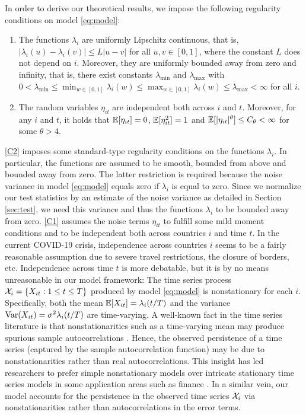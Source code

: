 \documentclass[a4paper,12pt]{article}
\numberwithin{equation}{section}
\begin{document}
In order to derive our theoretical results, we impose the following regularity conditions on model \eqref{eq:model}:
\begin{enumerate}[label=(C\arabic*),leftmargin=1.0cm]
\item \label{C2} The functions $\lambda_i$ are uniformly Lipschitz continuous, that is, $|\lambda_i(u) - \lambda_i(v)| \le L |u-v|$ for all $u, v \in [0,1]$, where the constant $L$ does not depend on $i$. Moreover, they are uniformly bounded away from zero and infinity, that is, there exist constants $\lambda_{\min}$ and $\lambda_{\max}$ with $0 < \lambda_{\min} \le \min_{w \in [0,1]} \lambda_i(w) \le \max_{w \in [0,1]} \lambda_i(w) \le \lambda_{\max} < \infty$ for all $i$. 
\item \label{C1} The random variables $\eta_{it}$ are independent both across $i$ and $t$. Moreover, for any $i$ and $t$, it holds that $\mathbb{E}[\eta_{it}] = 0$, $\mathbb{E}[\eta_{it}^2] = 1$ and $\mathbb{E}[|\eta_{it}|^\theta] \le C_\theta < \infty$ for some $\theta > 4$. 
\end{enumerate}
\ref{C2} imposes some standard-type regularity conditions on the functions $\lambda_i$. In particular, the functions are assumed to be smooth, bounded from above and bounded away from zero. The latter restriction is required because the noise variance in model \eqref{eq:model} equals zero if $\lambda_i$ is equal to zero. Since we normalize our test statistics by an estimate of the noise variance as detailed in Section \ref{sec:test}, we need this variance and thus the functions $\lambda_i$ to be bounded away from zero. \ref{C1} assumes the noise terms $\eta_{it}$ to fulfill some mild moment conditions and to be independent both across countries $i$ and time $t$. In the current COVID-19 crisis, independence across countries $i$ seems to be a fairly reasonable assumption due to severe travel restrictions, the closure of borders, etc. Independence across time $t$ is more debatable, but it is by no means unreasonable in our model framework: The time series process $\mathcal{X}_i = \{X_{it}: 1 \le t \le T\}$ produced by model \eqref{eq:model} is nonstationary for each $i$. Specifically, both the mean $\mathbb{E}[X_{it}] = \lambda_i(t/T)$ and the variance $\textnormal{Var}(X_{it}) = \sigma^2 \lambda_i(t/T)$ are time-varying. A well-known fact in the time series literature is that nonstationarities such as a time-varying mean may produce spurious sample autocorrelations \citep[cp.\ e.g.][]{MikoschStarica2004, Fryzlewicz2008}. Hence, the observed persistence of a time series (captured by the sample autocorrelation function) may be due to nonstationarities rather than real autocorrelations. This insight has led researchers to prefer simple nonstationary models over intricate stationary time series models in some application areas such as finance \citep[cp.][]{MikoschStarica2000, MikoschStarica2004, Fryzlewicz2006, HafnerLinton2010}. In a similar vein, our model accounts for the persistence in the observed time series $\mathcal{X}_i$ via nonstationarities rather than autocorrelations in the error terms. 
\end{document}
